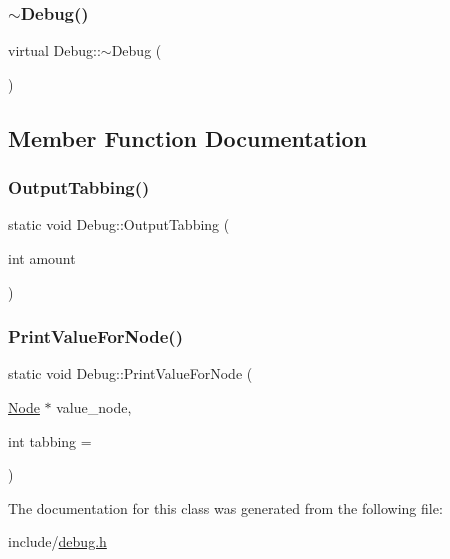 \subsubsection{\texorpdfstring{$\sim$\+Debug()}{~Debug()}}
{\footnotesize\ttfamily virtual Debug\+::$\sim$\+Debug (\begin{DoxyParamCaption}{ }\end{DoxyParamCaption})\hspace{0.3cm}{\ttfamily [virtual]}}



\subsection{Member Function Documentation}
\mbox{\label{classDebug_ae57630ccc6a2e3807f698ed6fef69786}} 
\subsubsection{\texorpdfstring{Output\+Tabbing()}{OutputTabbing()}}
{\footnotesize\ttfamily static void Debug\+::\+Output\+Tabbing (\begin{DoxyParamCaption}\item[{int}]{amount }\end{DoxyParamCaption})\hspace{0.3cm}{\ttfamily [static]}}

\mbox{\label{classDebug_a104d2378a5e251c0b4fb4fdb58802ead}} 
\subsubsection{\texorpdfstring{Print\+Value\+For\+Node()}{PrintValueForNode()}}
{\footnotesize\ttfamily static void Debug\+::\+Print\+Value\+For\+Node (\begin{DoxyParamCaption}\item[{\hyperlink{classNode}{Node} $\ast$}]{value\+\_\+node,  }\item[{int}]{tabbing = {} }\end{DoxyParamCaption})\hspace{0.3cm}{\ttfamily [static]}}



The documentation for this class was generated from the following file\+:\begin{DoxyCompactItemize}
\item 
include/\hyperlink{debug_8h}{debug.\+h}\end{DoxyCompactItemize}

